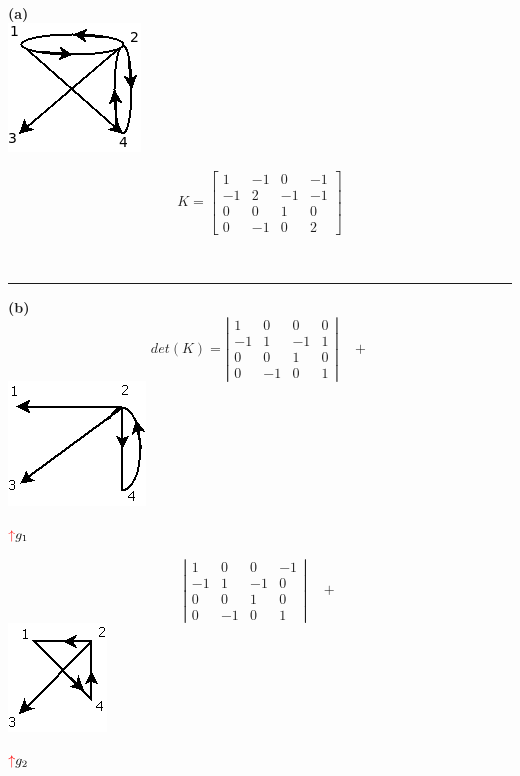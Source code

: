 \documentclass[10pt,a5paper]{book}
\begin{document}
\begin{figure}[H]
\caption{ }
\end{figure}
\hrulefill{}\\
\parbox{3cm}
{
  \textbf{(a)}\\
  \hspace*{.5in}\includegraphics[scale=.5]{Fig2_6_a1.png}
}\hspace*{.5in}
\parbox{2cm}
{
  \[
  K = \left[ \begin{array}{lccl}
      1 &  -1 &  0 &  -1 \\
      -1 &  2  & -1 & -1 \\
      0 &  0 &  1  & 0 \\
      0 &  -1 &  0  & 2 
    \end{array}
  \right]
  \]
}\hfill\\
\hrule
\hspace*{-1.2in}\parbox{6cm}
{
  \textbf{(b)}\\
    \[
    det(K) = \left| \begin{array}{cccc}
        1 & 0 & 0 & 0 \\
        -1 & 1 & -1 & 1 \\
        0 & 0 & 1 & 0 \\
        0 & -1 & 0 & 1
      \end{array}
    \right| \quad+ \]
 \hspace*{.8in}\includegraphics[scale=.6]{Fig2_6_b1.png}
 \begin{center} $\textcolor{rojo}{\uparrow} g_1$ \end{center}
}\hfill
\parbox{6cm}
{
  \[
   \left| \begin{array}{cccc}
        1 & 0 & 0 & -1 \\
        -1 & 1 & -1 & 0 \\
        0 & 0 & 1 & 0 \\
        0 & -1 & 0 & 1 
      \end{array}
    \right| \quad +\]
    \hspace*{.7in}\includegraphics[scale=.65]{Fig2_6_b2.png}
    \begin{center} $\textcolor{rojo}{\uparrow} g_2$ \end{center}
}\hfill\\
\end{document}
